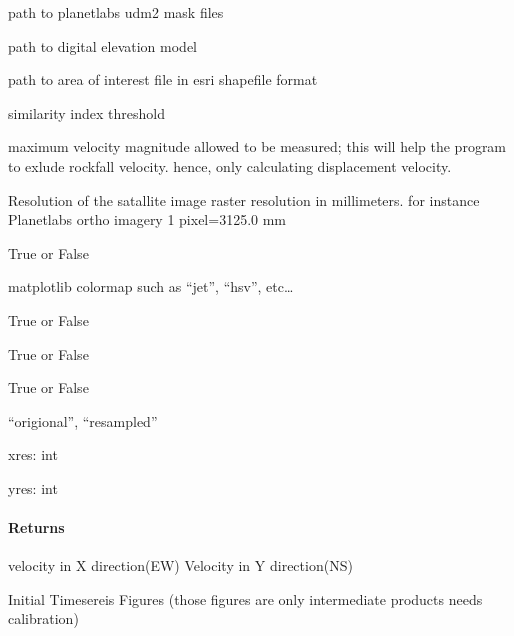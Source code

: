 \documentclass[letterpaper,10pt,english]{sphinxmanual}
\begin{document}
\begin{fulllineitems}
\begin{description}
\sphinxAtStartPar
path to planetlabs udm2 mask files

\sphinxAtStartPar
path to digital elevation model

\sphinxAtStartPar
path to area of interest file in esri shapefile format

\sphinxAtStartPar
similarity index threshold

\sphinxAtStartPar
maximum velocity magnitude allowed to be measured; this will help the program to exlude rockfall velocity.
hence, only calculating displacement velocity.

\sphinxAtStartPar
Resolution of the satallite image raster resolution in millimeters. 
for instance Planetlabs ortho imagery 1 pixel=3125.0 mm

\sphinxAtStartPar
True or False

\sphinxAtStartPar
matplotlib colormap such as “jet”, “hsv”, etc…

\sphinxAtStartPar
True or False

\sphinxAtStartPar
True or False

\sphinxAtStartPar
True or False

\sphinxAtStartPar
“origional”,  “resampled”

\end{description}

\sphinxAtStartPar
xres: int

\sphinxAtStartPar
yres: int


\paragraph{Returns}
\label{\detokenize{akhdefo_functions:id34}}\begin{description}
\sphinxAtStartPar
velocity in X direction(EW)
Velocity in Y direction(NS)

\sphinxAtStartPar
Initial Timesereis Figures (those figures are only intermediate products needs calibration)

\end{description}

\end{fulllineitems}
\end{document}
